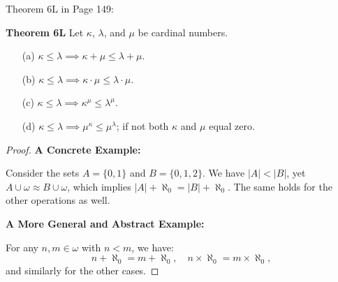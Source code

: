 Theorem 6L in Page 149:
\begin{leftbar}
    \textbf{Theorem 6L} Let \(\kappa\), \(\lambda\), and \(\mu\) be cardinal numbers.

    \begin{enumerate}
        \item[(a)] \(\kappa \leq \lambda \implies \kappa + \mu \leq \lambda + \mu\).
        \item[(b)] \(\kappa \leq \lambda \implies \kappa \cdot \mu \leq \lambda \cdot \mu\).
        \item[(c)] \(\kappa \leq \lambda \implies \kappa^\mu \leq \lambda^\mu\).
        \item[(d)] \(\kappa \leq \lambda \implies \mu^\kappa \leq \mu^\lambda\); if not both \(\kappa\) and \(\mu\) equal zero.
    \end{enumerate}
\end{leftbar}
\begin{proof}
    \textbf{A Concrete Example:}

    Consider the sets \(A = \{0, 1\}\) and \(B = \{0, 1, 2\}\).  
    We have \(|A| < |B|\), yet \(A \cup \omega \approx B \cup \omega\), which implies \(|A| + \aleph_0 = |B| + \aleph_0\).  
    The same holds for the other operations as well.

    \textbf{A More General and Abstract Example:}

    For any \(n, m \in \omega\) with \(n < m\), we have:
    \[
    n + \aleph_0 = m + \aleph_0, \quad n \times \aleph_0 = m \times \aleph_0,
    \]
    and similarly for the other cases.

\end{proof}


